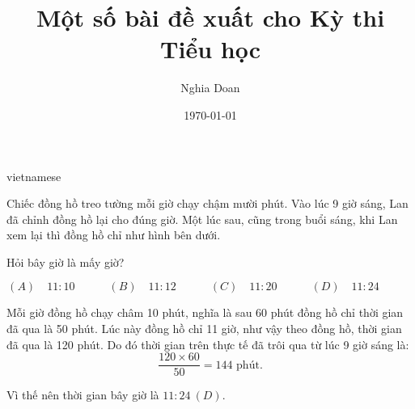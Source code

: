 \documentclass{article}
\title{Một số bài đề xuất cho Kỳ thi Tiểu học}
\author{Nghia Doan}
\date{\today}
\begin{document}
\begin{otherlanguage*}{vietnamese}

\maketitle

\begin{problem*}[PI-2024-C-P1]
    \label{problem:pi-2024-c-p1}

    Chiếc đồng hồ treo tường mỗi giờ chạy chậm mười phút.
    Vào lúc 9 giờ sáng, Lan đã chỉnh đồng hồ lại cho đúng giờ.
    Một lúc sau, cũng trong buổi sáng, khi Lan xem lại thì đồng hồ chỉ như hình bên dưới.

    \begin{center}
    \end{center}
    
    Hỏi bây giờ là mấy giờ?

    \[
        (A) \quad 11:10 \qquad \quad
        (B) \quad 11:12 \qquad \quad
        (C) \quad 11:20 \qquad \quad
        (D) \quad 11:24 \qquad \quad
    \]
\end{problem*}

\begin{soln}
    Mỗi giờ đồng hồ chạy châm 10 phút, nghĩa là sau 60 phút đồng hồ chỉ thời gian đã qua là 50 phút.
    Lúc này đồng hồ chỉ 11 giờ, như vậy theo đồng hồ, thời gian đã qua là 120 phút.
    Do đó thời gian trên thực tế đã trôi qua từ lúc 9 giờ sáng là:
    \[
        \frac{120 \times 60}{50} = 144 \text{\ phút.}
    \]

    Vì thế nên thời gian bây giờ là $\boxed{11:24\ (D).}$
\end{soln}

\bigbreak

\begin{problem*}[PI-2024-C-P2]
    \label{problem:pi-2024-c-p2}


\end{problem*}
\end{otherlanguage*}
\end{document}
